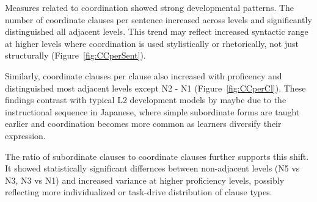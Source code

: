 
Measures related to coordination showed strong developmental patterns. The number of coordinate clauses per sentence
increased across levels and significantly
distinguished all adjacent levels. This trend may reflect increased syntactic range at higher levels where
coordination is used stylistically or rhetorically, not just structurally (Figure~\ref{fig:CCperSent}).

Similarly, coordinate clauses per clause also increased with proficency and distinguished most adjacent levels
except N2 - N1 (Figure~\ref{fig:CCperCl}). These findings contrast with typical L2 development models by maybe due
to the instructional sequence in Japanese, where simple subordinate forms are taught earlier and coordination
becomes more common as learners diversify their expression.

The ratio of subordinate clauses to
coordinate clauses further supports this shift. It showed statistically significant differnces between non-adjacent
levels (N5 vs N3, N3 vs N1) and increased variance at higher proficiency levels, possibly reflecting more
individualized or task-drive distribution of clause types.

